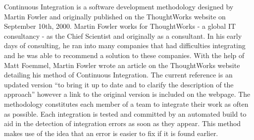 Continuous Integration is a software development methodology designed by Martin Fowler and originally published on the ThoughtWorks website on September 10th, 2000. Martin Fowler works for ThoughtWorks - a global IT consultancy - as the Chief Scientist and originally as a consultant.  In his early days of consulting, he ran into many companies that had difficulties integrating and he was able to recommend a solution to these companies. With the help of Matt Foemmel, Martin Fowler wrote an article on the ThoughtWorks website detailing his method of Continuous Integration. The current reference is an updated version ``to bring it up to date and to clarify the description of the approach''\cite{Fowler} however a link to the original version is included on the webpage.  The methodology constitutes each member of a team to integrate their work as often as possible. Each integration is tested and committed by an automated build to aid in the detection of integration errors as soon as they appear. \cite{Fowler} This method makes use of the idea that an error is easier to fix if it is found earlier.

